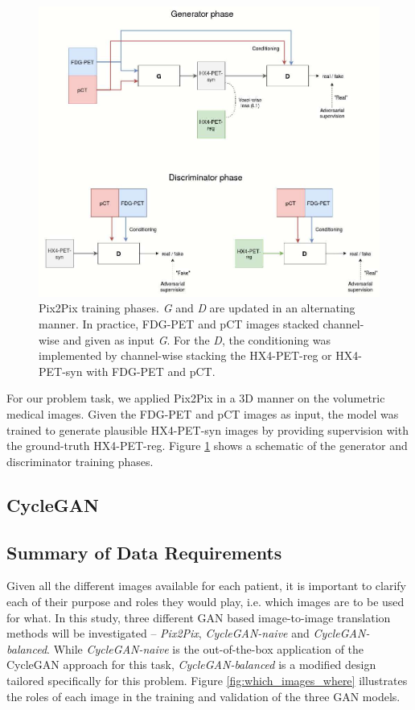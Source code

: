 \begin{figure}[h!]
    \centering
    \includegraphics[width=\linewidth]{figures/GANs/Pix2Pix.jpg}
    \caption{Pix2Pix training phases. \textit{G} and \textit{D} are updated in an alternating manner. In practice, FDG-PET and pCT images stacked channel-wise and given as input \textit{G}. For the \textit{D}, the conditioning was implemented by channel-wise stacking the HX4-PET-reg or HX4-PET-syn with FDG-PET and pCT.}
    \label{fig:pix2pix}
\end{figure}{}

For our problem task, we applied Pix2Pix in a 3D manner on the volumetric medical images. Given the FDG-PET and pCT images as input, the model was trained to generate plausible HX4-PET-syn images by providing supervision with the ground-truth HX4-PET-reg. Figure \ref{fig:pix2pix} shows a schematic of the generator and discriminator training phases.


\subsection{CycleGAN}
\label{cyclegan}




\subsection{Summary of Data Requirements}
\label{data_requirements}
Given all the different images available for each patient, it is important to clarify each of their purpose and roles they would play, i.e. which images are to be used for what. In this study, three different GAN based image-to-image translation methods will be investigated -- \textit{Pix2Pix}, \textit{CycleGAN-naive} and \textit{CycleGAN-balanced}. While \textit{CycleGAN-naive} is the out-of-the-box application of the CycleGAN approach for this task, \textit{CycleGAN-balanced} is a modified design tailored specifically for this problem. Figure \ref{fig:which_images_where} illustrates the roles of each image in the training and validation of the three GAN models.


